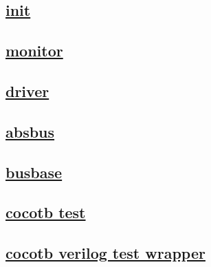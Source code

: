 \documentclass{article}
\begin{document}
  


  \subsection{\href{../files/__init__-py.html}{init}}
  \subsection{\href{../files/monitor-py.html}{monitor}}
  \subsection{\href{../files/driver-py.html}{driver}}
  \subsection{\href{../files/absbus-py.html}{absbus}}
  \subsection{\href{../files3/busbase-py.html}{busbase}}
  \subsection{\href{../files2/test-py.html}{cocotb test}}
  \subsection{\href{../files2/test-v.html}{cocotb verilog test wrapper}}
\end{document}
